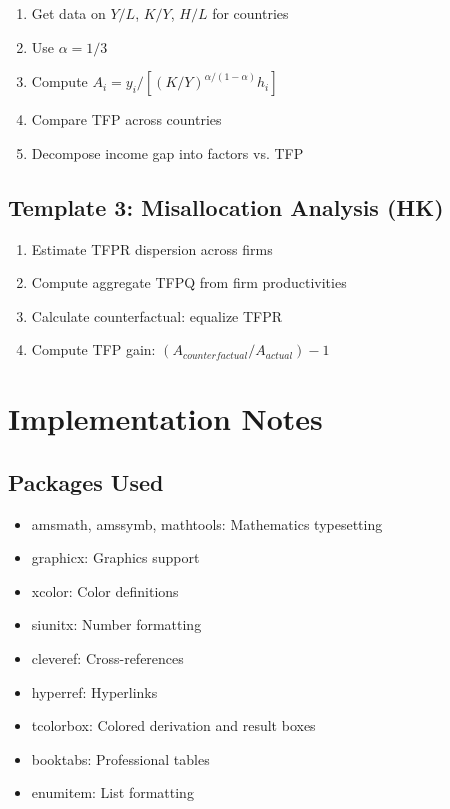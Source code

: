 \documentclass[a4paper,11pt]{article}
\begin{document}
\begin{enumerate}
    \item Get data on $Y/L$, $K/Y$, $H/L$ for countries
    \item Use $\alpha = 1/3$
    \item Compute $A_i = y_i / [(K/Y)^{\alpha/(1-\alpha)} h_i]$
    \item Compare TFP across countries
    \item Decompose income gap into factors vs. TFP
\end{enumerate}

\subsection*{Template 3: Misallocation Analysis (HK)}

\begin{enumerate}
    \item Estimate TFPR dispersion across firms
    \item Compute aggregate TFPQ from firm productivities
    \item Calculate counterfactual: equalize TFPR
    \item Compute TFP gain: $(A_{counterfactual}/A_{actual}) - 1$
\end{enumerate}

\clearpage
\section{Implementation Notes}

\subsection*{Packages Used}
\begin{itemize}
    \item amsmath, amssymb, mathtools: Mathematics typesetting
    \item graphicx: Graphics support
    \item xcolor: Color definitions
    \item siunitx: Number formatting
    \item cleveref: Cross-references
    \item hyperref: Hyperlinks
    \item tcolorbox: Colored derivation and result boxes
    \item booktabs: Professional tables
    \item enumitem: List formatting
\end{itemize}
\end{document}
